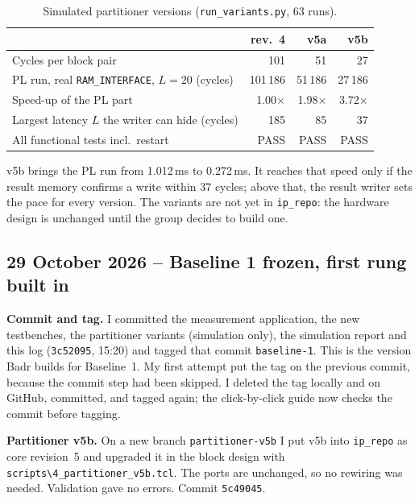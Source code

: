 \documentclass[11pt,a4paper]{article}
\newcommand{\code}[1]{\texttt{#1}}
\begin{document}
\begin{table}[H]
\centering
\begin{tabular}{@{}lrrr@{}}
\toprule
 & \textbf{rev.~4} & \textbf{v5a} & \textbf{v5b} \\
\midrule
Cycles per block pair & 101 & 51 & 27 \\
PL run, real \code{RAM\_INTERFACE}, $L = 20$ (cycles) & 101\,186 & 51\,186 & 27\,186 \\
Speed-up of the PL part & 1.00$\times$ & 1.98$\times$ & 3.72$\times$ \\
Largest latency $L$ the writer can hide (cycles) & 185 & 85 & 37 \\
All functional tests incl.\ restart & PASS & PASS & PASS \\
\bottomrule
\end{tabular}
\caption{Simulated partitioner versions (\code{run\_variants.py}, 63 runs).}
\end{table}

v5b brings the PL run from 1.012\,ms to 0.272\,ms. It reaches that speed only if the result memory confirms a write within 37 cycles; above that, the result writer sets the pace for every version. The variants are not yet in \code{ip\_repo}: the hardware design is unchanged until the group decides to build one.

\subsection{29 October 2026 -- Baseline 1 frozen, first rung built in}
\textbf{Commit and tag.} I committed the measurement application, the new testbenches, the partitioner variants (simulation only), the simulation report and this log (\code{3c52095}, 15:20) and tagged that commit \code{baseline-1}. This is the version Badr builds for Baseline~1. My first attempt put the tag on the previous commit, because the commit step had been skipped. I deleted the tag locally and on GitHub, committed, and tagged again; the click-by-click guide now checks the commit before tagging.

\textbf{Partitioner v5b.} On a new branch \code{partitioner-v5b} I put v5b into \code{ip\_repo} as core revision~5 and upgraded it in the block design with \code{scripts\textbackslash 4\_partitioner\_v5b.tcl}. The ports are unchanged, so no rewiring was needed. Validation gave no errors. Commit \code{5c49045}.
\end{document}
